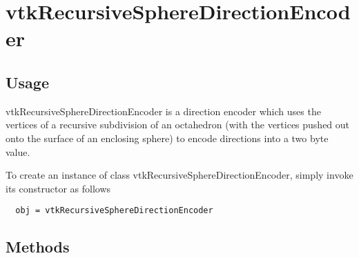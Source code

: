 \section{vtkRecursiveSphereDirectionEncoder}

\subsection{Usage}

 vtkRecursiveSphereDirectionEncoder is a direction encoder which uses the 
 vertices of a recursive subdivision of an octahedron (with the vertices
 pushed out onto the surface of an enclosing sphere) to encode directions
 into a two byte value. 


To create an instance of class vtkRecursiveSphereDirectionEncoder, simply
invoke its constructor as follows
\begin{verbatim}
  obj = vtkRecursiveSphereDirectionEncoder
\end{verbatim}
\subsection{Methods}

